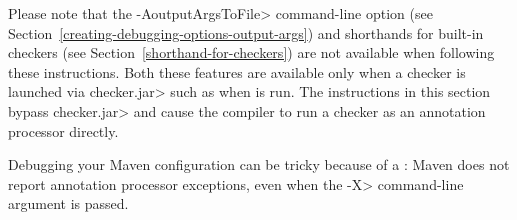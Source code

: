 Please note that the \<-AoutputArgsToFile> command-line option
(see Section~\ref{creating-debugging-options-output-args}) and shorthands for built-in checkers
(see Section~\ref{shorthand-for-checkers}) are not available when
following these instructions.  Both these features are available only when a checker is
launched via \<checker.jar> such as when 
is run.  The instructions in this section
bypass \<checker.jar> and cause the compiler to run a
checker as an annotation processor directly.

Debugging your Maven configuration can be tricky because of a
: Maven does not report annotation processor exceptions, even when
the \<-X> command-line argument is passed.


